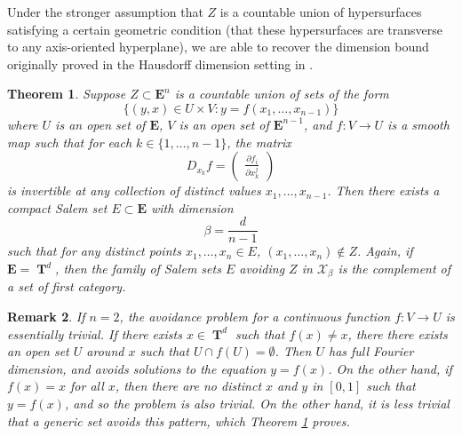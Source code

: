 \documentclass[12pt,reqno]{article}
\numberwithin{equation}{section}
\DeclareMathOperator{\RR}{\mathbf{R}}
\DeclareMathOperator{\TT}{\mathbf{T}}
\newtheorem{theorem}{Theorem}
\newtheorem{remark}[theorem]{Remark}
\numberwithin{theorem}{section}
\begin{document}
Under the stronger assumption that $Z$ is a countable union of hypersurfaces satisfying a certain geometric condition (that these hypersurfaces are transverse to any axis-oriented hyperplane), we are able to recover the dimension bound originally proved in the Hausdorff dimension setting in \cite{PramanikFraser}.

\begin{theorem} \label{theoremJOICVIOJVI122}
    Suppose $Z \subset \mathbf{E}^n$ is a countable union of sets of the form
    \[ \{ (y,x) \in U \times V : y = f(x_1,\dots,x_{n-1}) \} \]
    where $U$ is an open set of $\mathbf{E}$, $V$ is an open set of $\mathbf{E}^{n-1}$, and $f: V \to U$ is a smooth map such that for each $k \in \{ 1, \dots, n-1 \}$, the matrix
    \[ D_{x_k} f = \begin{pmatrix} \frac{\partial f_i}{\partial x_k^j} \end{pmatrix} \]
    is invertible at any collection of distinct values $x_1,\dots,x_{n-1}$. Then there exists a compact Salem set $E \subset \mathbf{E}$ with dimension
    \[ \beta = \frac{d}{n-1} \]
    such that for any distinct points $x_1, \dots, x_n \in E$, $(x_1, \dots, x_n) \not \in Z$. Again, if $\mathbf{E} = \TT^d$, then the family of Salem sets $E$ avoiding $Z$ in $\mathcal{X}_\beta$ is the complement of a set of first category.
\end{theorem}

\begin{remark}
    If $n = 2$, the avoidance problem for a continuous function $f: V \to U$ is essentially trivial. If there exists $x \in \TT^d$ such that $f(x) \neq x$, there there exists an open set $U$ around $x$ such that $U \cap f(U) = \emptyset$. Then $U$ has full Fourier dimension, and avoids solutions to the equation $y = f(x)$. On the other hand, if $f(x) = x$ for all $x$, then there are no distinct $x$ and $y$ in $[0,1]$ such that $y = f(x)$, and so the problem is also trivial. On the other hand, it is less trivial that a generic set avoids this pattern, which Theorem \ref{theoremJOICVIOJVI122} proves.
\end{remark}
\end{document}
